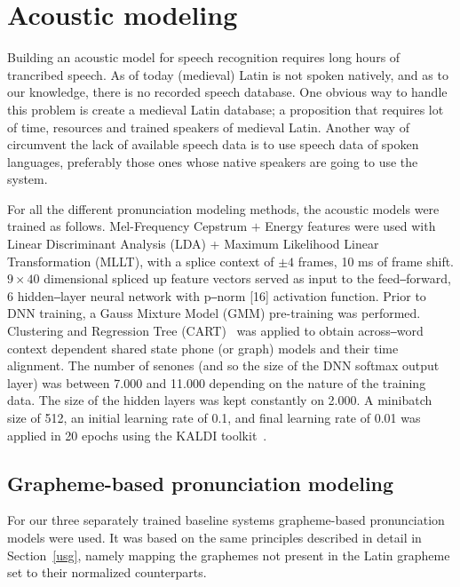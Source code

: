 \documentclass[runningheads,a4paper]{llncs}
\begin{document}
\section{Acoustic modeling}\label{AM}
Building an acoustic model for speech recognition requires long hours of trancribed speech.
As of today (medieval) Latin is not spoken natively, and as to our knowledge, there is no recorded speech database.
One obvious way to handle this problem is create a medieval Latin database; a proposition that requires lot of time, resources and trained speakers of medieval Latin. 
Another way of circumvent the lack of available speech data is to use speech data of spoken languages, preferably those ones whose native speakers are going to use the system. 

For all the different pronunciation modeling methods, the acoustic models were trained as follows.
Mel-Frequency Cepstrum $+$ Energy features were used with Linear Discriminant Analysis (LDA) + Maximum Likelihood Linear Transformation (MLLT), with a splice context of $\pm4$ frames, 10 ms of frame shift.
$9\times40$ dimensional spliced up feature vectors served as input to the feed‒forward, 6 hidden‒layer neural network with p‒norm [16] activation function.
Prior to DNN training, a Gauss Mixture Model (GMM) pre-training was performed.
Clustering and Regression Tree (CART)~\cite{kaldi} was applied to obtain across‒word context dependent shared state phone (or graph) models and their time alignment.
The number of senones (and so the size of the DNN softmax output layer) was between 7.000 and 11.000 depending on the nature of the training data.
The size of the hidden layers was kept constantly on 2.000.
A minibatch size of 512, an initial learning rate of 0.1, and final learning rate of 0.01 was applied in 20 epochs using the KALDI toolkit~\cite{kaldi}.
\subsection{Grapheme-based pronunciation modeling}\label{baseline}
For our three separately trained baseline systems grapheme-based pronunciation models were used.
It was based on the same principles described in detail in Section~\ref{usg}, namely mapping the graphemes not present in the Latin grapheme set to their normalized counterparts.
\end{document}
